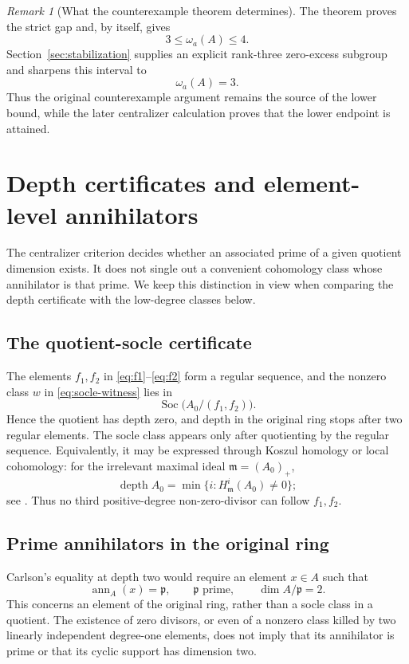 \documentclass[11pt]{amsart}
\theoremstyle{definition}
\theoremstyle{remark}
\newtheorem{remark}[theorem]{Remark}
\DeclareMathOperator{\depth}{depth}
\DeclareMathOperator{\ann}{ann}
\DeclareMathOperator{\Soc}{Soc}
\begin{document}
\begin{remark}[What the counterexample theorem determines]
The theorem proves the strict gap and, by itself, gives
\[
3\leq\omega_a(A)\leq4.
\]
Section~\ref{sec:stabilization} supplies an explicit rank-three zero-excess subgroup and sharpens this interval to
\[
\omega_a(A)=3.
\]
Thus the original counterexample argument remains the source of the lower bound, while the later centralizer calculation proves that the lower endpoint is attained.
\end{remark}



\section{Depth certificates and element-level annihilators}
\label{sec:witnesses}

The centralizer criterion decides whether an associated prime of a given quotient dimension exists.  It does not single out a convenient cohomology class whose annihilator is that prime.  We keep this distinction in view when comparing the depth certificate with the low-degree classes below.

\subsection{The quotient-socle certificate}

The elements $f_1,f_2$ in \eqref{eq:f1}--\eqref{eq:f2} form a regular sequence, and the nonzero class $w$ in \eqref{eq:socle-witness} lies in
\[
\Soc\bigl(A_0/(f_1,f_2)\bigr).
\]
Hence the quotient has depth zero, and depth in the original ring stops after two regular elements.  The socle class appears only after quotienting by the regular sequence.  Equivalently, it may be expressed through Koszul homology or local cohomology: for the irrelevant maximal ideal $\mathfrak m=(A_0)_+$,
\[
\depth A_0=\min\{i:H^i_{\mathfrak m}(A_0)\neq0\};
\]
see \cite{BrunsHerzog,BrodmannSharp}.  Thus no third positive-degree non-zero-divisor can follow $f_1,f_2$.

\subsection{Prime annihilators in the original ring}

Carlson's equality at depth two would require an element $x\in A$ such that
\[
\ann_A(x)=\mathfrak p,
\qquad
\mathfrak p\text{ prime},
\qquad
\dim A/\mathfrak p=2.
\]
This concerns an element of the original ring, rather than a socle class in a quotient.  The existence of zero divisors, or even of a nonzero class killed by two linearly independent degree-one elements, does not imply that its annihilator is prime or that its cyclic support has dimension two.
\end{document}
